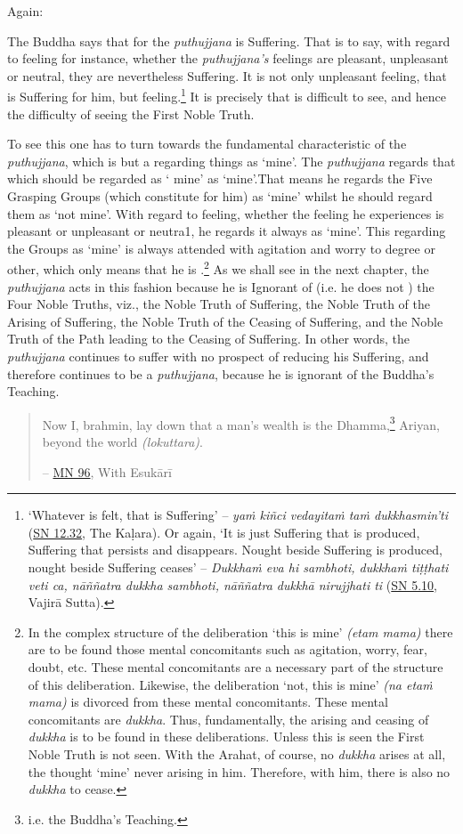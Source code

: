 Again:

The Buddha says that for the \emph{puthujjana}  is Suffering. That is to say, with regard to feeling for instance, whether the \emph{puthujjana's} feelings are pleasant, unpleasant or neutral, they are nevertheless Suffering. It is not only unpleasant feeling, that is Suffering for him, but  feeling.\footnote{`Whatever is felt, that is Suffering' -- \emph{yaṁ kiñci vedayitaṁ taṁ dukkhasmin'ti} (\href{https://suttacentral.net/sn12.32/en/bodhi}{SN 12.32}, The Kaḷara). Or again, `It is just Suffering that is produced, Suffering that persists and disappears. Nought beside Suffering is produced, nought beside Suffering ceases' -- \emph{Dukkhaṁ eva hi sambhoti, dukkhaṁ tiṭṭhati veti ca, nāññatra dukkha sambhoti, nāññatra dukkhā nirujjhati ti} (\href{https://suttacentral.net/sn5.10/en/bodhi}{SN 5.10}, Vajirā Sutta).} It is precisely  that is difficult to see, and hence the difficulty of seeing the First Noble Truth.

To see this one has to turn towards the fundamental characteristic of the \emph{puthujjana}, which is but a regarding things as `mine'. The \emph{puthujjana} regards that which should be regarded as ` mine' as `mine'.That means he regards the Five Grasping Groups (which constitute  for him) as `mine' whilst he should regard them as `not mine'. With regard to feeling, whether the feeling he experiences is pleasant or unpleasant or neutra1, he regards it always as `mine'. This regarding the Groups as `mine' is always attended with agitation and worry to  degree or other, which only means that he is .\footnote{In the complex structure of the deliberation `this is mine' \emph{(etam mama)} there are to be found those mental concomitants such as agitation, worry, fear, doubt, etc. These mental concomitants are a necessary part of the structure of this deliberation. Likewise, the deliberation `not, this is mine' \emph{(na etaṁ mama)} is divorced from these mental concomitants. These mental concomitants are \emph{dukkha}. Thus, fundamentally, the arising and ceasing of \emph{dukkha} is to be found in these deliberations. Unless this is seen the First Noble Truth is not seen. With the Arahat, of course, no \emph{dukkha} arises at all, the thought `mine' never arising in him. Therefore, with him, there is also no \emph{dukkha} to cease.} As we shall see in the next chapter, the \emph{puthujjana} acts in this fashion because he is Ignorant of (i.e. he does not ) the Four Noble Truths, viz., the Noble Truth of Suffering, the Noble Truth of the Arising of Suffering, the Noble Truth of the Ceasing of Suffering, and the Noble Truth of the Path leading to the Ceasing of Suffering. In other words, the \emph{puthujjana} continues to suffer with no prospect of reducing his Suffering, and therefore continues to be a \emph{puthujjana}, because he is ignorant of the Buddha's Teaching.

\begin{quote}
Now I, brahmin, lay down that a man's wealth is the Dhamma,\footnote{i.e. the Buddha's Teaching.} Ariyan, beyond the world \emph{(lokuttara)}.

 -- \href{https://suttacentral.net/mn96/en/sujato}{MN 96}, With Esukārī
\end{quote}
